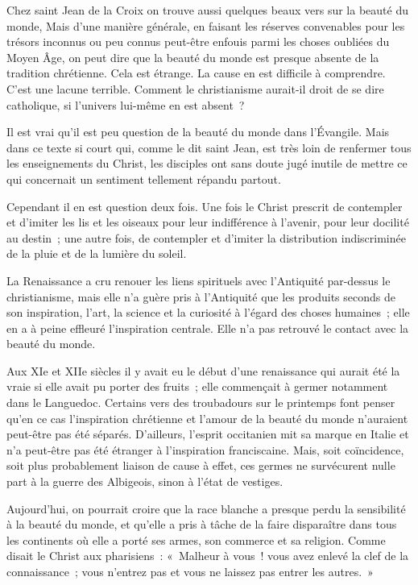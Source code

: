 \documentclass[french,twoside]{book} %
\begin{document}
Chez saint Jean de la Croix on trouve aussi quelques beaux vers sur la beauté du monde, Mais d'une manière générale, en faisant les réserves convenables pour les trésors inconnus ou peu connus peut-être enfouis parmi les choses oubliées du Moyen Âge, on peut dire que la beauté du monde est presque absente de la tradition chrétienne. Cela est étrange. La cause en est difficile à comprendre. C'est une lacune terrible. Comment le christianisme aurait-il droit de se dire catholique, si l'univers lui-même en est absent ?\par
Il est vrai qu'il est peu question de la beauté du monde dans l'Évangile. Mais dans ce texte si court qui, comme le dit saint Jean, est très loin de renfermer tous les enseignements du Christ, les disciples ont sans doute jugé inutile de mettre ce qui concernait un sentiment tellement répandu partout.\par
Cependant il en est question deux fois. Une fois le Christ prescrit de contempler et d'imiter les lis et les oiseaux pour leur indifférence à l'avenir, pour leur docilité au destin ; une autre fois, de contempler et d'imiter la distribution indiscriminée de la pluie et de la lumière du soleil.\par
La Renaissance a cru renouer les liens spirituels avec l'Antiquité par-dessus le christianisme, mais elle n'a guère pris à l'Antiquité que les produits seconds de son inspiration, l'art, la science et la curiosité à l'égard des choses humaines ; elle en a à peine effleuré l'inspiration centrale. Elle n'a pas retrouvé le contact avec la beauté du monde.\par
Aux XIe et XIIe siècles il y avait eu le début d'une renaissance qui aurait été la vraie si elle avait pu porter des fruits ; elle commençait à germer notamment dans le Languedoc. Certains vers des troubadours sur le printemps font penser qu'en ce cas l'inspiration chrétienne et l'amour de la beauté du monde n'auraient peut-être pas été séparés. D'ailleurs, l'esprit occitanien mit sa marque en Italie et n'a peut-être pas été étranger à l'inspiration franciscaine. Mais, soit coïncidence, soit plus probablement liaison de cause à effet, ces germes ne survécurent nulle part à la guerre des Albigeois, sinon à l'état de vestiges.\par
Aujourd'hui, on pourrait croire que la race blanche a presque perdu la sensibilité à la beauté du monde, et qu'elle a pris à tâche de la faire disparaître dans tous les continents où elle a porté ses armes, son commerce et sa religion. Comme disait le Christ aux pharisiens : « Malheur à vous ! vous avez enlevé la clef de la connaissance ; vous n'entrez pas et vous ne laissez pas entrer les autres. »\par
\end{document}
